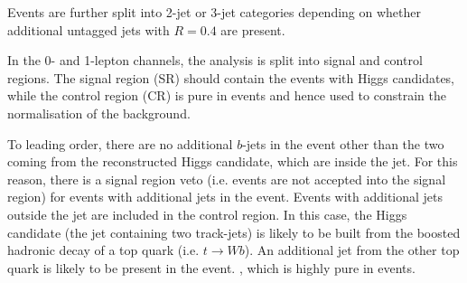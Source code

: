 Events are further split into 2-jet or 3-jet categories depending on whether additional untagged \smallR jets with $R=0.4$ are present.


In the 0- and 1-lepton channels, the analysis is split into signal and control regions.
The signal region (SR) should contain the events with Higgs candidates, while the control region (CR) is pure in \ttbar events and hence used to constrain the normalisation of the \ttbar background.

To leading order, there are no additional $b$-jets in the event other than the two coming from the reconstructed Higgs candidate, which are inside the \largeR jet.
For this reason, there is a signal region veto (i.e. events are not accepted into the signal region) for events with additional \btagged jets in the event.
Events with additional \btagged jets outside the \largeR jet are included in the control region.
In this case, the Higgs candidate (the \largeR jet containing two \btagged track-jets) is likely to be built from the boosted hadronic decay of a top quark (i.e. $t \rightarrow Wb$).
An additional \btagged jet from the other top quark is likely to be present in the event.
, which is highly pure in \ttbar events.


